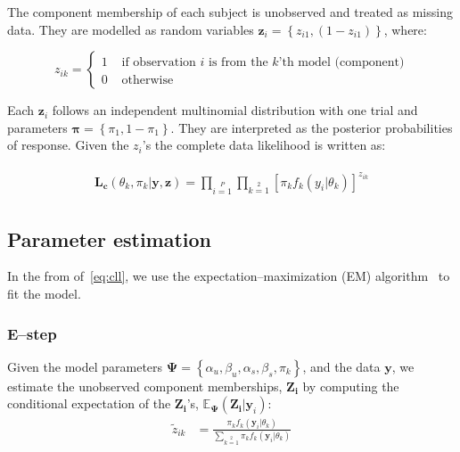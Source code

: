 \documentclass[11pt]{article}
\begin{document}
The component membership of each subject is unobserved and  treated as missing data. They are modelled as random variables  $\mathbf{z}_i = \left\{z_{i1},(1-z_{i1})\right\}$, where:

$$
z_{ik} = \left\{ \begin{array}{rl}
1 &\mbox{ if observation $i$ is from the $k$'th model (component)} \\
0&\mbox{ otherwise}
\end{array} \right.
$$

Each $\mathbf{z}_{i}$ follows an independent multinomial distribution with one trial and  parameters $\boldsymbol{\pi}=\left\{\pi_1,1-\pi_1\right\}$. They are interpreted as the posterior probabilities of response. Given the $z_i$'s the complete data likelihood is written as:

\begin{align}
\begin{split}
\mathbf{L_c}(\theta_k,\pi_k|\mathbf{y},\mathbf{z}) = \prod\limits_{i=1}\limits^P\prod\limits_{k=1}\limits^2\left[\pi_k f_k(y_i|\theta_k)\right]^{z_{ik}}\label{eq:cll}
\end{split}
\end{align}

\subsection{Parameter estimation}
In the from of~\eqref{eq:cll}, we use the expectation--maximization (EM) algorithm~\cite{Dempster:1977ul} to fit the model. 

\subsubsection{E--step}
Given the model parameters $\boldsymbol{\Psi}=\left\{\alpha_u,\beta_u,\alpha_s,\beta_s,\pi_k\right\}$, and the data $\mathbf{y}$, we estimate the unobserved component memberships, $\mathbf{Z_i}$  by computing the conditional expectation of the $\mathbf{Z_i}$'s,  $\mathbb{E}\boldsymbol{_\Psi}(\mathbf{Z_i}|\mathbf{y}_i)$:
\begin{align}
\tilde z_{ik} &= \frac{\pi_k f_k(\mathbf{y}_i|\theta_k)}{\sum\limits_{k=1}\limits^{2}\pi_kf_k(\mathbf{y}_i|\theta_k)}
\end{align}
\end{document}
